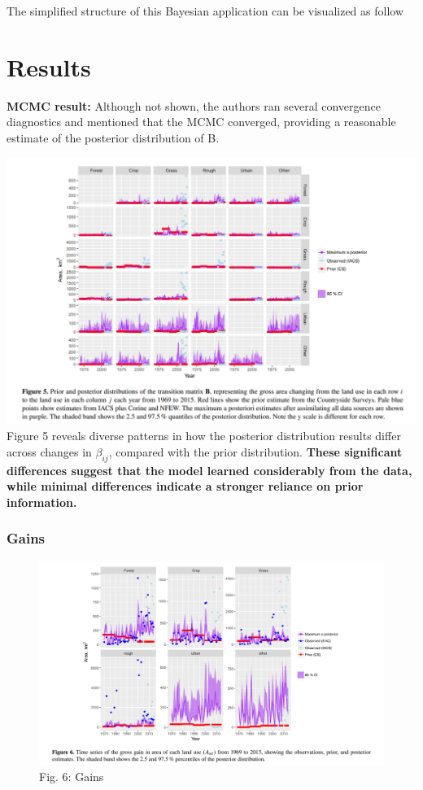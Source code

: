 \documentclass[
  letterpaper,
  DIV=11,
  numbers=noendperiod]{scrartcl}
\begin{document}
The simplified structure of this Bayesian application can be visualized
as follow

\hypertarget{results}{%
\section{Results}\label{results}}

\textbf{MCMC result:} Although not shown, the authors ran several
convergence diagnostics and mentioned that the MCMC converged, providing
a reasonable estimate of the posterior distribution of B.

\includegraphics{bayesian_final_project_files/figures/fig_5.png} Figure
5 reveals diverse patterns in how the posterior distribution results
differ across changes in \(\beta_{ij}\), compared with the prior
distribution. \textbf{These significant differences suggest that the
model learned considerably from the data, while minimal differences
indicate a stronger reliance on prior information.}

\subsubsection{Gains}

\begin{figure}

{\centering \includegraphics{bayesian_final_project_files/figures/fig_6.png}

}

\caption{Fig. 6: Gains}

\end{figure}
\end{document}
